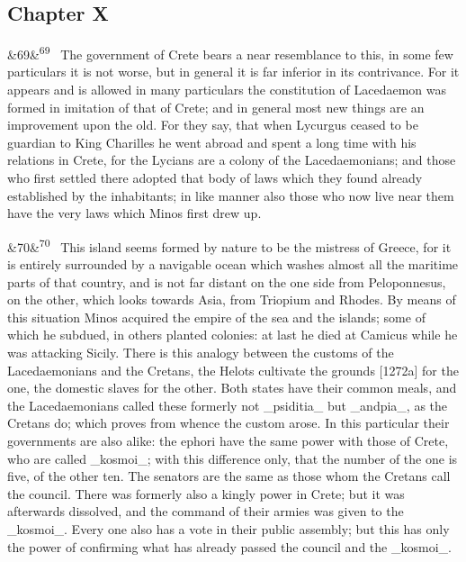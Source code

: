 \documentclass[12pt]{article}
\newcommand{\para}[1][]{\par\noindent\ifx&#1&\else\textsuperscript{\footnotesize #1}~\fi}
\begin{document}
\subsection*{Chapter X}

\para[69] The government of Crete bears a near resemblance to this, in some few particulars it is not worse, but in general it is far inferior in its contrivance. For it appears and is allowed in many particulars the constitution of Lacedaemon was formed in imitation of that of Crete; and in general most new things are an improvement upon the old. For they say, that when Lycurgus ceased to be guardian to King Charilles he went abroad and spent a long time with his relations in Crete, for the Lycians are a colony of the Lacedaemonians; and those who first settled there adopted that body of laws which they found already established by the inhabitants; in like manner also those who now live near them have the very laws which Minos first drew up.

\para[70] This island seems formed by nature to be the mistress of Greece, for it is entirely surrounded by a navigable ocean which washes almost all the maritime parts of that country, and is not far distant on the one side from Peloponnesus, on the other, which looks towards Asia, from Triopium and Rhodes. By means of this situation Minos acquired the empire of the sea and the islands; some of which he subdued, in others planted colonies: at last he died at Camicus while he was attacking Sicily. There is this analogy between the customs of the Lacedaemonians and the Cretans, the Helots cultivate the grounds [1272a] for the one, the domestic slaves for the other. Both states have their common meals, and the Lacedaemonians called these formerly not \_psiditia\_ but \_andpia\_, as the Cretans do; which proves from whence the custom arose. In this particular their governments are also alike: the ephori have the same power with those of Crete, who are called \_kosmoi\_; with this difference only, that the number of the one is five, of the other ten. The senators are the same as those whom the Cretans call the council. There was formerly also a kingly power in Crete; but it was afterwards dissolved, and the command of their armies was given to the \_kosmoi\_. Every one also has a vote in their public assembly; but this has only the power of confirming what has already passed the council and the \_kosmoi\_.
\end{document}
